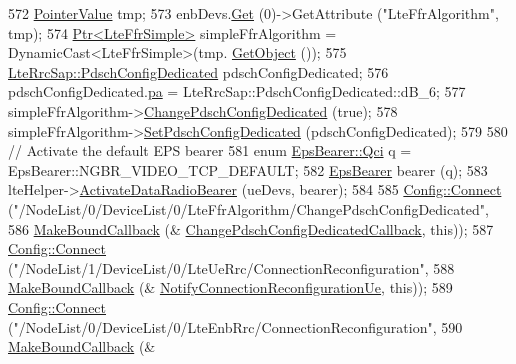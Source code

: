 \begin{DoxyCode}
572   \hyperlink{classns3_1_1PointerValue}{PointerValue} tmp;
573   enbDevs.\hyperlink{classns3_1_1NetDeviceContainer_a677d62594b5c9d2dea155cc5045f4d0b}{Get} (0)->GetAttribute (\textcolor{stringliteral}{"LteFfrAlgorithm"}, tmp);
574   \hyperlink{classns3_1_1Ptr}{Ptr<LteFfrSimple>} simpleFfrAlgorithm = DynamicCast<LteFfrSimple>(tmp.
      \hyperlink{classns3_1_1PointerValue_a53d0f9f5c538ea6120c96a1ecb1344a8}{GetObject} ());
575   \hyperlink{structns3_1_1LteRrcSap_1_1PdschConfigDedicated}{LteRrcSap::PdschConfigDedicated} pdschConfigDedicated;
576   pdschConfigDedicated.\hyperlink{structns3_1_1LteRrcSap_1_1PdschConfigDedicated_aa9b1574a63fb83c53649305ca95aeb31}{pa} = LteRrcSap::PdschConfigDedicated::dB\_6;
577   simpleFfrAlgorithm->\hyperlink{classns3_1_1LteFfrSimple_a23f83819e8f2262243592a111f8668fe}{ChangePdschConfigDedicated} (\textcolor{keyword}{true});
578   simpleFfrAlgorithm->\hyperlink{classns3_1_1LteFfrSimple_a3da8348dd3cc4173464933912ae7524b}{SetPdschConfigDedicated} (pdschConfigDedicated);
579 
580   \textcolor{comment}{// Activate the default EPS bearer}
581   \textcolor{keyword}{enum} \hyperlink{structns3_1_1EpsBearer_aecf0c67109c5eb4ec0b07226fff5885e}{EpsBearer::Qci} q = EpsBearer::NGBR\_VIDEO\_TCP\_DEFAULT;
582   \hyperlink{structns3_1_1EpsBearer}{EpsBearer} bearer (q);
583   lteHelper->\hyperlink{classns3_1_1LteHelper_ac896e16cf162e4beeaa292d39ab1b700}{ActivateDataRadioBearer} (ueDevs, bearer);
584 
585   \hyperlink{group__config_ga4014f151241cd0939b6cb64409605736}{Config::Connect} (\textcolor{stringliteral}{"/NodeList/0/DeviceList/0/LteFfrAlgorithm/ChangePdschConfigDedicated"},
586                    \hyperlink{group__makeboundcallback_ga1725d6362e6065faa0709f7c93f8d770}{MakeBoundCallback} (&
      \hyperlink{lte-test-downlink-power-control_8cc_ab8053a215895f29bb4d67d4ff7e54bd1}{ChangePdschConfigDedicatedCallback}, \textcolor{keyword}{this}));
587   \hyperlink{group__config_ga4014f151241cd0939b6cb64409605736}{Config::Connect} (\textcolor{stringliteral}{"/NodeList/1/DeviceList/0/LteUeRrc/ConnectionReconfiguration"},
588                    \hyperlink{group__makeboundcallback_ga1725d6362e6065faa0709f7c93f8d770}{MakeBoundCallback} (&
      \hyperlink{lte-test-downlink-power-control_8cc_a1dd1318fb19198c99f7f822e7be384ab}{NotifyConnectionReconfigurationUe}, \textcolor{keyword}{this}));
589   \hyperlink{group__config_ga4014f151241cd0939b6cb64409605736}{Config::Connect} (\textcolor{stringliteral}{"/NodeList/0/DeviceList/0/LteEnbRrc/ConnectionReconfiguration"},
590                    \hyperlink{group__makeboundcallback_ga1725d6362e6065faa0709f7c93f8d770}{MakeBoundCallback} (&

\end{DoxyCode}
